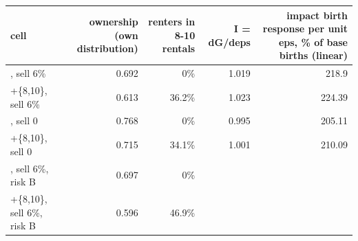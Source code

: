 \begin{tabular}{lrrrr}
\toprule
cell & ownership (own distribution) & renters in 8-10 rentals & I = dG/deps & impact birth response per unit eps, \% of base births (linear) \\
\midrule
[0,6], sell 6\% & 0.692 & 0\% & 1.019 & 218.9 \\
[0,6]+\{8,10\}, sell 6\% & 0.613 & 36.2\% & 1.023 & 224.39 \\
[0,6], sell 0 & 0.768 & 0\% & 0.995 & 205.11 \\
[0,6]+\{8,10\}, sell 0 & 0.715 & 34.1\% & 1.001 & 210.09 \\
[0,6], sell 6\%, risk B & 0.697 & 0\% &  &  \\
[0,6]+\{8,10\}, sell 6\%, risk B & 0.596 & 46.9\% &  &  \\
\bottomrule
\end{tabular}
